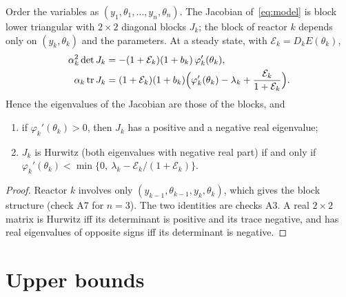 \documentclass[11pt,a4paper]{report}
\begin{document}
\begin{lemma}[note={linearisation}]\label{lem:jac}
Order the variables as \((y_1,\theta_1,\dots,y_n,\theta_n)\). The Jacobian of~\eqref{eq:model} is block lower
triangular with \(2\times2\) diagonal blocks \(J_k\); the block of reactor \(k\) depends only on
\((y_k,\theta_k)\) and the parameters. At a steady state, with \(\mathcal E_k=D_kE(\theta_k)\),
\begin{align*}
\alpha_k^2\det J_k&=-(1+\mathcal E_k)(1+b_k)\,\varphi_k'(\theta_k),\\
\alpha_k\operatorname{tr}J_k&=(1+\mathcal E_k)(1+b_k)\Bigl(\varphi_k'(\theta_k)-\lambda_k+\frac{\mathcal E_k}{1+\mathcal E_k}\Bigr).
\end{align*}
Hence the eigenvalues of the Jacobian are those of the blocks, and
\begin{enumerate}
\item if \(\varphi_k'(\theta_k)>0\), then \(J_k\) has a positive and a negative real eigenvalue;
\item \(J_k\) is Hurwitz (both eigenvalues with negative real part) if and only if
\(\varphi_k'(\theta_k)<\min\{0,\ \lambda_k-\mathcal E_k/(1+\mathcal E_k)\}\).
\end{enumerate}
\end{lemma}
\begin{proof}
Reactor \(k\) involves only \((y_{k-1},\theta_{k-1},y_k,\theta_k)\), which gives the block structure (check A7 for
\(n=3\)). The two identities are checks A3. A real \(2\times2\) matrix is Hurwitz iff its determinant is positive and
its trace negative, and has real eigenvalues of opposite signs iff its determinant is negative.
\end{proof}

\section{Upper bounds}\label{sec:upper}
\end{document}

